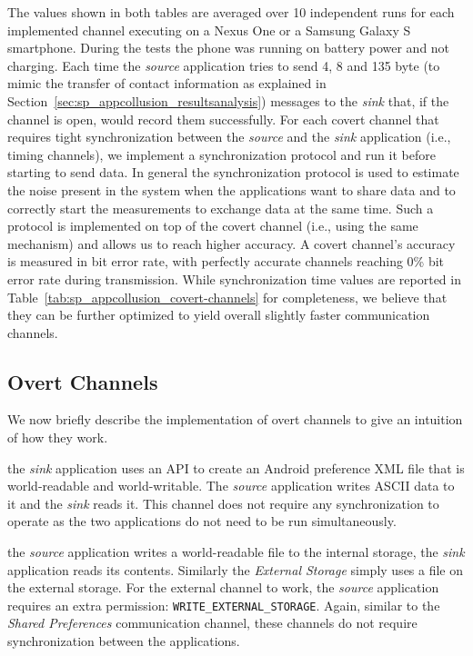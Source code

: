 The values shown in both tables are averaged over 10 independent runs
for each implemented channel executing on a Nexus One or a Samsung
Galaxy S smartphone. During the tests the phone was running on battery
power and not charging. Each time the \emph{source} application tries
to send 4, 8 and 135 byte (to mimic the transfer of contact
information as explained in Section~\ref{sec:sp_appcollusion_resultsanalysis})
messages to the \emph{sink} that, if the channel is open, would record
them successfully. For each covert channel that requires tight
synchronization between the \emph{source} and the \emph{sink}
application (i.e., timing channels), we implement a synchronization
protocol and run it before starting to send data. In general the
synchronization protocol is used to estimate the noise present in the
system when the applications want to share data and to correctly start
the measurements to exchange data at the same time. Such a protocol is
implemented on top of the covert channel (i.e., using the same
mechanism) and allows us to reach higher accuracy. A covert channel's
accuracy is measured in bit error rate, with perfectly accurate
channels reaching 0\% bit error rate during transmission. While
synchronization time values are reported in
Table~\ref{tab:sp_appcollusion_covert-channels} for completeness, we believe that they
can be further optimized to yield overall slightly faster
communication channels.

\subsection{Overt Channels}

We now briefly describe the implementation of overt channels to give
an intuition of how they work.

 the \emph{sink} application
uses an API to create an Android preference XML file that is
world-readable and world-writable. The \emph{source} application
writes ASCII data to it and the \emph{sink} reads it. This channel
does not require any synchronization to operate as the two
applications do not need to be run simultaneously.

 the \emph{source} application
writes a world-readable file to the internal storage, the \emph{sink}
application reads its contents. Similarly the \emph{External Storage}
simply uses a file on the external storage. For the external channel
to work, the \emph{source} application requires an extra permission:
\texttt{WRITE\_EXTERNAL\_STORAGE}. Again, similar to the \emph{Shared
  Preferences} communication channel, these channels do not require
synchronization between the applications.

